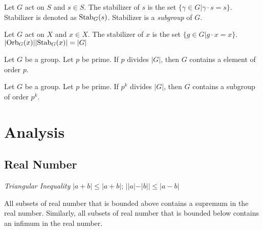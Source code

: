 \documentclass[12pt]{article}
\begin{document}
\begin{definition}[Stabilizer]\label{def:stabilizer} 
	Let $G$ act on $S$ and $s \in S$. The stabilizer of $s$ is the set $\{\gamma \in G | \gamma\cdot s = s\}$. Stabilizer is denoted as $\text{Stab}_{G}({s})$.
	Stabilizer is a \emph{subgroup} of $G$. 
\end{definition}


\begin{theorem}
	Let $G$ act on $X$ and $x \in X$. The stabilizer of $x$ is the set $\{g \in G | g\cdot x = x\}$.
	$|\text{Orb}_{G}({x})||\text{Stab}_{G}({x})|=|G|$
\end{theorem}

\begin{theorem}
	Let $G$ be a group. Let $p$ be prime. If $p$ divides $|G|$, then $G$ contains a element of order $p$.
\end{theorem}

\begin{theorem}
	Let $G$ be a group. Let $p$ be prime. If $p^k$ divides $|G|$, then $G$ contains a subgroup of order $p^k$.
\end{theorem}

\section{Analysis}

\subsection{Real Number}
\emph{Triangular Inequality} $|a+b|\leq |a+b|$; $||a|-|b||\leq |a-b|$

\begin{axiom} 
	All subsets of real number that is bounded above contains a supremum in the real number.
	Similarly, all subsets of real number that is bounded below contains an infimum in the real number.
\end{axiom}

\end{document}
